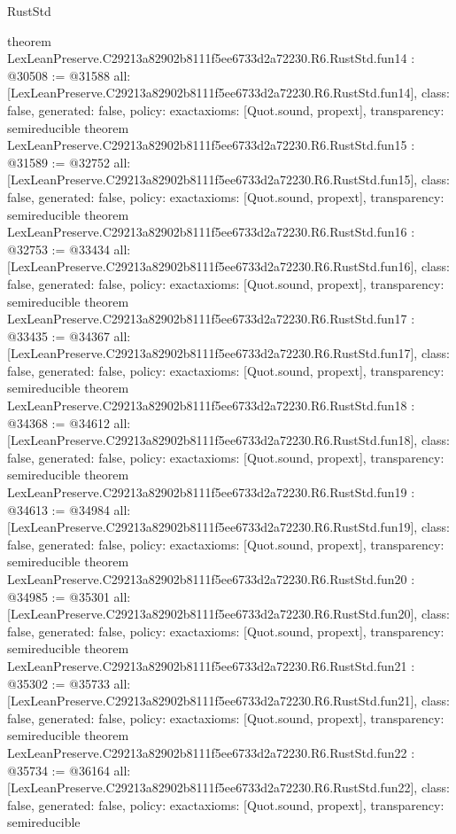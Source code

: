 \begin{lexlean}{RustStd}
\begin{coremodule}
{}
theorem LexLeanPreserve.C29213a82902b8111f5ee6733d2a72230.R6.RustStd.fun14 : @30508 := @31588 {
  all: [LexLeanPreserve.C29213a82902b8111f5ee6733d2a72230.R6.RustStd.fun14],
  class: false,
  generated: false,
  policy: exact{axioms: [Quot.sound, propext]},
  transparency: semireducible
}
theorem LexLeanPreserve.C29213a82902b8111f5ee6733d2a72230.R6.RustStd.fun15 : @31589 := @32752 {
  all: [LexLeanPreserve.C29213a82902b8111f5ee6733d2a72230.R6.RustStd.fun15],
  class: false,
  generated: false,
  policy: exact{axioms: [Quot.sound, propext]},
  transparency: semireducible
}
theorem LexLeanPreserve.C29213a82902b8111f5ee6733d2a72230.R6.RustStd.fun16 : @32753 := @33434 {
  all: [LexLeanPreserve.C29213a82902b8111f5ee6733d2a72230.R6.RustStd.fun16],
  class: false,
  generated: false,
  policy: exact{axioms: [Quot.sound, propext]},
  transparency: semireducible
}
theorem LexLeanPreserve.C29213a82902b8111f5ee6733d2a72230.R6.RustStd.fun17 : @33435 := @34367 {
  all: [LexLeanPreserve.C29213a82902b8111f5ee6733d2a72230.R6.RustStd.fun17],
  class: false,
  generated: false,
  policy: exact{axioms: [Quot.sound, propext]},
  transparency: semireducible
}
theorem LexLeanPreserve.C29213a82902b8111f5ee6733d2a72230.R6.RustStd.fun18 : @34368 := @34612 {
  all: [LexLeanPreserve.C29213a82902b8111f5ee6733d2a72230.R6.RustStd.fun18],
  class: false,
  generated: false,
  policy: exact{axioms: [Quot.sound, propext]},
  transparency: semireducible
}
theorem LexLeanPreserve.C29213a82902b8111f5ee6733d2a72230.R6.RustStd.fun19 : @34613 := @34984 {
  all: [LexLeanPreserve.C29213a82902b8111f5ee6733d2a72230.R6.RustStd.fun19],
  class: false,
  generated: false,
  policy: exact{axioms: [Quot.sound, propext]},
  transparency: semireducible
}
theorem LexLeanPreserve.C29213a82902b8111f5ee6733d2a72230.R6.RustStd.fun20 : @34985 := @35301 {
  all: [LexLeanPreserve.C29213a82902b8111f5ee6733d2a72230.R6.RustStd.fun20],
  class: false,
  generated: false,
  policy: exact{axioms: [Quot.sound, propext]},
  transparency: semireducible
}
theorem LexLeanPreserve.C29213a82902b8111f5ee6733d2a72230.R6.RustStd.fun21 : @35302 := @35733 {
  all: [LexLeanPreserve.C29213a82902b8111f5ee6733d2a72230.R6.RustStd.fun21],
  class: false,
  generated: false,
  policy: exact{axioms: [Quot.sound, propext]},
  transparency: semireducible
}
theorem LexLeanPreserve.C29213a82902b8111f5ee6733d2a72230.R6.RustStd.fun22 : @35734 := @36164 {
  all: [LexLeanPreserve.C29213a82902b8111f5ee6733d2a72230.R6.RustStd.fun22],
  class: false,
  generated: false,
  policy: exact{axioms: [Quot.sound, propext]},
  transparency: semireducible
}
\end{coremodule}
\end{lexlean}
